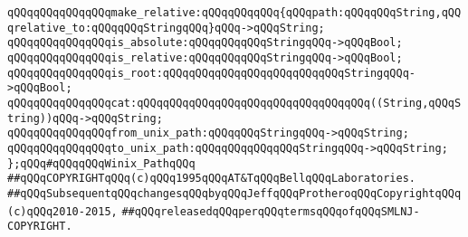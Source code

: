 \verb|qQQqqQQqqQQqqQQqmake_relative:qQQqqQQqqQQq{qQQqpath:qQQqqQQqString,qQQqrelative_to:qQQqqQQqStringqQQq}qQQq->qQQqString;|\newline
\verb|qQQqqQQqqQQqqQQqis_absolute:qQQqqQQqqQQqStringqQQq->qQQqBool;|\newline
\verb|qQQqqQQqqQQqqQQqis_relative:qQQqqQQqqQQqStringqQQq->qQQqBool;|\newline
\newline
\verb|qQQqqQQqqQQqqQQqis_root:qQQqqQQqqQQqqQQqqQQqqQQqqQQqStringqQQq->qQQqBool;|\newline
\newline
\verb|qQQqqQQqqQQqqQQqcat:qQQqqQQqqQQqqQQqqQQqqQQqqQQqqQQqqQQq((String,qQQqString))qQQq->qQQqString;|\newline
\newline
\verb|qQQqqQQqqQQqqQQqfrom_unix_path:qQQqqQQqStringqQQq->qQQqString;|\newline
\verb|qQQqqQQqqQQqqQQqto_unix_path:qQQqqQQqqQQqqQQqStringqQQq->qQQqString;|\newline
\newline
\verb|};qQQq#qQQqqQQqWinix_PathqQQq|\newline
\newline
\newline
\newline
\verb|##qQQqCOPYRIGHTqQQq(c)qQQq1995qQQqAT&TqQQqBellqQQqLaboratories.|\newline
\verb|##qQQqSubsequentqQQqchangesqQQqbyqQQqJeffqQQqProtheroqQQqCopyrightqQQq(c)qQQq2010-2015,|\newline
\verb|##qQQqreleasedqQQqperqQQqtermsqQQqofqQQqSMLNJ-COPYRIGHT.|\newline

